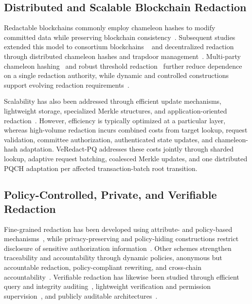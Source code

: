 \documentclass[lettersize,journal]{IEEEtran}
\begin{document}
    \subsection{Distributed and Scalable Blockchain Redaction}
    
    Redactable blockchains commonly employ chameleon hashes to modify
    committed data while preserving blockchain consistency~\cite{ref9}.
    Subsequent studies extended this model to consortium blockchains
    ~\cite{ref2} and decentralized redaction through distributed chameleon
    hashes and trapdoor management~\cite{ref1,ref3,ref6,ref19,ref30}.
    Multi-party chameleon hashing~\cite{ref12} and robust threshold
    redaction~\cite{ref27} further reduce dependence on a single redaction
    authority, while dynamic and controlled constructions support evolving
    redaction requirements~\cite{ref5,ref16,ref36}.
    
    Scalability has also been addressed through efficient update
    mechanisms, lightweight storage, specialized Merkle structures, and
    application-oriented redaction~\cite{ref14,ref20,ref21,ref23,ref26}.
    However, efficiency is typically optimized at a particular layer,
    whereas high-volume redaction incurs combined costs from target lookup,
    request validation, committee authorization, authenticated state
    updates, and chameleon-hash adaptation. VeRedact-PQ addresses these
    costs jointly through sharded lookup, adaptive request batching,
    coalesced Merkle updates, and one distributed PQCH adaptation per
    affected transaction-batch root transition.
    
    \subsection{Policy-Controlled, Private, and Verifiable Redaction}
    
    Fine-grained redaction has been developed using attribute- and
    policy-based mechanisms~\cite{ref8,ref15}, while privacy-preserving and
    policy-hiding constructions restrict disclosure of sensitive
    authorization information~\cite{ref4,ref18,ref24,ref31,ref34}. Other schemes
    strengthen traceability and accountability through dynamic policies,
    anonymous but accountable redaction, policy-compliant rewriting, and
    cross-chain accountability~\cite{ref25,ref28,ref29,ref32,ref35}. Verifiable
    redaction has likewise been studied through efficient query and
    integrity auditing~\cite{ref13}, lightweight verification and
    permission supervision~\cite{ref20}, and publicly auditable
    architectures~\cite{ref33}.
    
\end{document}
